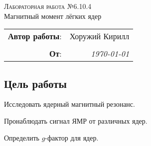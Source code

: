 

\begin{center}
    \LARGE \textsc{Лабораторная работа №6.10.4} \\
    \vspace{3 mm}
    \large Магнитный момент лёгких ядер
\end{center}


\phantom{42}

\begin{flushright}
    \begin{tabular}{rr}
        \textbf{Автор работы}: 
        & Хоружий Кирилл \\
        & \\
        \textbf{От}: &
        \textit{\today}\\
    \end{tabular}
\end{flushright}

\thispagestyle{empty}

\vspace{10mm}


\subsection*{Цель работы}
\begin{enumerate*}
    \item Исследовать ядерный магнитный резонанс.
    \item Пронаблюдать сигнал ЯМР от различных ядер.
    \item Определить $g$-фактор для ядер.
\end{enumerate*}






